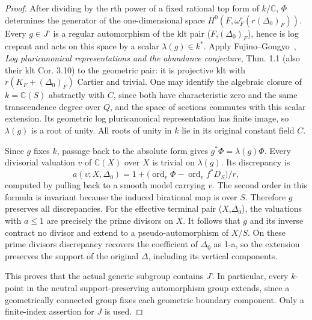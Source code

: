 \documentclass[11pt]{article}
\begin{document}
\begin{proof}
After dividing by the rth power of a fixed rational top form of \(k/\mathbb C\), \(\Phi\) determines the
generator of the one-dimensional space \(H^0(F,\omega_F^r(r(\Delta_0)_F))\). Every \(g\in J\)' is
a regular automorphism of the klt pair (\(F\),\((\Delta_0)_F\)), hence is log crepant and acts on this
space by a scalar \(\lambda(g)\in k^*\). Apply Fujino--Gongyo~\cite{FujinoGongyo}, \emph{Log
pluricanonical representations and the abundance conjecture}, Thm. 1.1 (also their klt Cor. 3.10) to the
geometric pair: it is projective klt with \(r(K_F+(\Delta_0)_F)\) Cartier and trivial. One may
identify the algebraic closure of \(k=\mathbb C(S)\) abstractly with \(C\), since both have
characteristic zero and the same transcendence degree over \(Q\), and the space of sections commutes with
this scalar extension. Its geometric log pluricanonical representation has finite image, so
\(\lambda(g)\) is a root of unity. All roots of unity in \(k\) lie in its original constant field
\(C\).

Since \(g\) fixes \(k\), passage back to the absolute form gives \(g^*\Phi=\lambda(g)\Phi\). Every divisorial valuation \(v\) of \(\mathbb C(X)\) over \(X\) is trivial on \(\lambda(g)\). Its discrepancy is \[
 a(v;X,\Delta_0)=1+\big(\operatorname{ord}_v\Phi-
                    \operatorname{ord}_v f^*D_S\big)/r ,
\] computed by pulling back to a smooth model carrying \(v\). The second order in this formula is invariant because the induced birational map is over \(S\). Therefore \(g\) preserves all discrepancies. For the effective terminal pair (\(X\),\(\Delta_0\)), the valuations with \(a\le1\) are precisely the prime divisors on \(X\). It follows that \(g\) and its inverse contract no divisor and extend to a pseudo-automorphism of \(X/S\). On these prime divisors discrepancy recovers the coefficient of \(\Delta_0\) as 1-a, so the extension preserves the support of the original \(\Delta\), including its vertical components.

This proves that the actual generic subgroup contains \(J\)'. In particular, every \(k\)-point in the
neutral support-preserving automorphism group extends, since a geometrically connected group fixes each
geometric boundary component. Only a finite-index assertion for \(J\) is used.


\end{proof}
\end{document}

